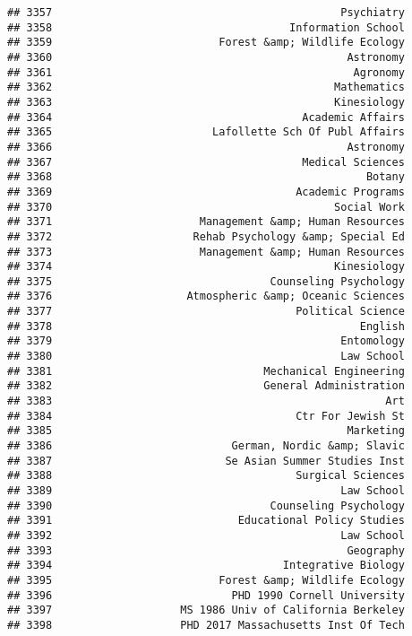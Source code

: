 \documentclass[
]{article}
\begin{document}
\begin{verbatim}
## 3357                                             Psychiatry
## 3358                                     Information School
## 3359                          Forest &amp; Wildlife Ecology
## 3360                                              Astronomy
## 3361                                               Agronomy
## 3362                                            Mathematics
## 3363                                            Kinesiology
## 3364                                       Academic Affairs
## 3365                         Lafollette Sch Of Publ Affairs
## 3366                                              Astronomy
## 3367                                       Medical Sciences
## 3368                                                 Botany
## 3369                                      Academic Programs
## 3370                                            Social Work
## 3371                       Management &amp; Human Resources
## 3372                      Rehab Psychology &amp; Special Ed
## 3373                       Management &amp; Human Resources
## 3374                                            Kinesiology
## 3375                                  Counseling Psychology
## 3376                     Atmospheric &amp; Oceanic Sciences
## 3377                                      Political Science
## 3378                                                English
## 3379                                             Entomology
## 3380                                             Law School
## 3381                                 Mechanical Engineering
## 3382                                 General Administration
## 3383                                                    Art
## 3384                                      Ctr For Jewish St
## 3385                                              Marketing
## 3386                            German, Nordic &amp; Slavic
## 3387                           Se Asian Summer Studies Inst
## 3388                                      Surgical Sciences
## 3389                                             Law School
## 3390                                  Counseling Psychology
## 3391                             Educational Policy Studies
## 3392                                             Law School
## 3393                                              Geography
## 3394                                    Integrative Biology
## 3395                          Forest &amp; Wildlife Ecology
## 3396                            PHD 1990 Cornell University
## 3397                    MS 1986 Univ of California Berkeley
## 3398                    PHD 2017 Massachusetts Inst Of Tech

\end{verbatim}
\end{document}
